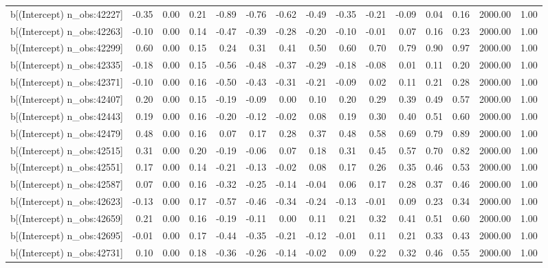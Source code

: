 \begin{table}[ht]
\begin{tabular}{rrrrrrrrrrrrrrr}
  b[(Intercept) n\_obs:42227] & -0.35 & 0.00 & 0.21 & -0.89 & -0.76 & -0.62 & -0.49 & -0.35 & -0.21 & -0.09 & 0.04 & 0.16 & 2000.00 & 1.00 \\ 
  b[(Intercept) n\_obs:42263] & -0.10 & 0.00 & 0.14 & -0.47 & -0.39 & -0.28 & -0.20 & -0.10 & -0.01 & 0.07 & 0.16 & 0.23 & 2000.00 & 1.00 \\ 
  b[(Intercept) n\_obs:42299] & 0.60 & 0.00 & 0.15 & 0.24 & 0.31 & 0.41 & 0.50 & 0.60 & 0.70 & 0.79 & 0.90 & 0.97 & 2000.00 & 1.00 \\ 
  b[(Intercept) n\_obs:42335] & -0.18 & 0.00 & 0.15 & -0.56 & -0.48 & -0.37 & -0.29 & -0.18 & -0.08 & 0.01 & 0.11 & 0.20 & 2000.00 & 1.00 \\ 
  b[(Intercept) n\_obs:42371] & -0.10 & 0.00 & 0.16 & -0.50 & -0.43 & -0.31 & -0.21 & -0.09 & 0.02 & 0.11 & 0.21 & 0.28 & 2000.00 & 1.00 \\ 
  b[(Intercept) n\_obs:42407] & 0.20 & 0.00 & 0.15 & -0.19 & -0.09 & 0.00 & 0.10 & 0.20 & 0.29 & 0.39 & 0.49 & 0.57 & 2000.00 & 1.00 \\ 
  b[(Intercept) n\_obs:42443] & 0.19 & 0.00 & 0.16 & -0.20 & -0.12 & -0.02 & 0.08 & 0.19 & 0.30 & 0.40 & 0.51 & 0.60 & 2000.00 & 1.00 \\ 
  b[(Intercept) n\_obs:42479] & 0.48 & 0.00 & 0.16 & 0.07 & 0.17 & 0.28 & 0.37 & 0.48 & 0.58 & 0.69 & 0.79 & 0.89 & 2000.00 & 1.00 \\ 
  b[(Intercept) n\_obs:42515] & 0.31 & 0.00 & 0.20 & -0.19 & -0.06 & 0.07 & 0.18 & 0.31 & 0.45 & 0.57 & 0.70 & 0.82 & 2000.00 & 1.00 \\ 
  b[(Intercept) n\_obs:42551] & 0.17 & 0.00 & 0.14 & -0.21 & -0.13 & -0.02 & 0.08 & 0.17 & 0.26 & 0.35 & 0.46 & 0.53 & 2000.00 & 1.00 \\ 
  b[(Intercept) n\_obs:42587] & 0.07 & 0.00 & 0.16 & -0.32 & -0.25 & -0.14 & -0.04 & 0.06 & 0.17 & 0.28 & 0.37 & 0.46 & 2000.00 & 1.00 \\ 
  b[(Intercept) n\_obs:42623] & -0.13 & 0.00 & 0.17 & -0.57 & -0.46 & -0.34 & -0.24 & -0.13 & -0.01 & 0.09 & 0.23 & 0.34 & 2000.00 & 1.00 \\ 
  b[(Intercept) n\_obs:42659] & 0.21 & 0.00 & 0.16 & -0.19 & -0.11 & 0.00 & 0.11 & 0.21 & 0.32 & 0.41 & 0.51 & 0.60 & 2000.00 & 1.00 \\ 
  b[(Intercept) n\_obs:42695] & -0.01 & 0.00 & 0.17 & -0.44 & -0.35 & -0.21 & -0.12 & -0.01 & 0.11 & 0.21 & 0.33 & 0.43 & 2000.00 & 1.00 \\ 
  b[(Intercept) n\_obs:42731] & 0.10 & 0.00 & 0.18 & -0.36 & -0.26 & -0.14 & -0.02 & 0.09 & 0.22 & 0.32 & 0.46 & 0.55 & 2000.00 & 1.00 \\ 

\end{tabular}
\end{table}
